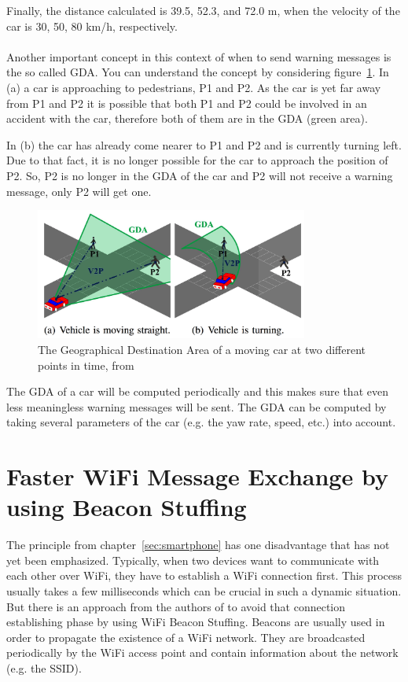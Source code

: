 \documentclass[]{ccs-thesis}
\begin{document}
Finally, the distance calculated is 39.5, 52.3, and 72.0 m, when the velocity of the car is 30, 50, 80 km/h, respectively. \cite{v2pcomm}
\\\\
Another important concept in this context of when to send warning messages is the so called \ac{GDA}. You can understand the concept by considering figure~\ref{fig:gda}. In (a) a car is approaching to pedestrians, P1 and P2. As the car is yet far away from P1 and P2 it is possible that both P1 and P2 could be involved in an accident with the car, therefore both of them are in the \ac{GDA} (green area).

In (b) the car has already come nearer to P1 and P2 and is currently turning left. Due to that fact, it is no longer possible for the car to approach the position of P2. So, P2 is no longer in the \ac{GDA} of the car and P2 will not receive a warning message, only P2 will get one.

\begin{figure}[h]
	\centering
	\includegraphics[width=0.8\textwidth]{figures/5_gda}
	\caption{The Geographical Destination Area of a moving car at two different points in time, from \cite{v2pcomm}}%
	\label{fig:gda}%
\end{figure}

The \ac{GDA} of a car will be computed periodically and this makes sure that even less meaningless warning messages will be sent. The \ac{GDA} can be computed by taking several parameters of the car (e.g. the yaw rate, speed, etc.) into account.

\section{Faster WiFi Message Exchange by using Beacon Stuffing}\label{sec:beacon}

The principle from chapter~\ref{sec:smartphone} has one disadvantage that has not yet been emphasized.
Typically, when two devices want to communicate with each other over WiFi, they have to establish a WiFi connection first. This process usually takes a few milliseconds which can be crucial in such a dynamic situation. But there is an approach from the authors of \cite{beacon} to avoid that connection establishing phase by using WiFi Beacon Stuffing. Beacons are usually used in order to propagate the existence of a WiFi network. They are broadcasted periodically by the WiFi access point and contain information about the network (e.g. the SSID).
\end{document}
